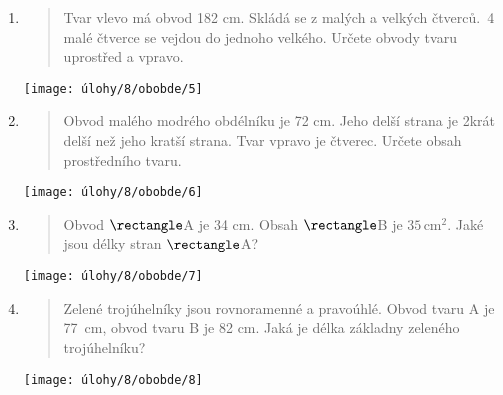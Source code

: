\begin{enumerate}
\begin{minipage}[t]{\linewidth}
    \end{minipage}

    \item
    \begin{minipage}[t]{\linewidth}
        \begin{quote}
            Tvar vlevo má obvod 182 cm.
            Skládá se z malých a velkých čtverců.\ 4 malé čtverce se vejdou do jednoho velkého.
            Určete obvody tvaru uprostřed a vpravo.
        \end{quote}
        \centering
        \texttt{[image: úlohy/8/obobde/5]}

    \end{minipage}

    \item
    \begin{minipage}[t]{\linewidth}
        \begin{quote}
            Obvod malého modrého obdélníku je 72 cm.
            Jeho delší strana je 2krát delší než jeho kratší strana.
            Tvar vpravo je čtverec.
            Určete obsah prostředního tvaru.
        \end{quote}
        \centering
        \texttt{[image: úlohy/8/obobde/6]}

    \end{minipage}

    \item
    \begin{minipage}[t]{\linewidth}
        \begin{quote}
            Obvod $\rectangle$A je 34 cm.
            Obsah $\rectangle$B je $35\,\text{cm}^{2}$.
            Jaké jsou délky stran $\rectangle$A?
        \end{quote}
        \centering
        \texttt{[image: úlohy/8/obobde/7]}

    \end{minipage}

    \item
    \begin{minipage}[t]{\linewidth}
        \begin{quote}
            Zelené trojúhelníky jsou rovnoramenné a pravoúhlé.
            Obvod tvaru A je 77~cm, obvod tvaru B je 82 cm.
            Jaká je délka základny zeleného trojúhelníku?
        \end{quote}
        \centering
        \texttt{[image: úlohy/8/obobde/8]}


\end{minipage}
\end{enumerate}

